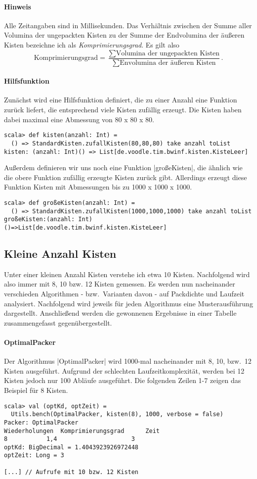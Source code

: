 \paragraph{Hinweis}
 Alle Zeitangaben sind in Millisekunden.
 Das Verhältnis zwischen der Summe aller Volumina der ungepackten Kisten zu der Summe der Endvolumina der äußeren Kisten bezeichne ich als \emph{Komprimierungsgrad}.
 Es gilt also
 \[ \text{Komprimierungsgrad} = \dfrac{\sum\text{Volumina der ungepackten Kisten}}{\sum\text{Envolumina der äußeren Kisten}} .\]
\paragraph{Hilfsfunktion}
 Zunächst wird eine Hilfsfunktion definiert, die zu einer Anzahl eine Funktion zurück liefert, die entsprechend viele Kisten zufällig erzeugt.
 Die Kisten haben dabei maximal eine Abmessung von 80 x 80 x 80.
\begin{lstlisting}
scala> def kisten(anzahl: Int) =
  () => StandardKisten.zufallKisten(80,80,80) take anzahl toList
kisten: (anzahl: Int)() => List[de.voodle.tim.bwinf.kisten.KisteLeer]
\end{lstlisting}
 Außerdem definieren wir uns noch eine Funktion |großeKisten|, die ähnlich wie die obere Funktion zufällig erzeugte Kisten zurück gibt.
 Allerdings erzeugt diese Funktion Kisten mit Abmessungen bis zu 1000 x 1000 x 1000.
\begin{lstlisting}
scala> def großeKisten(anzahl: Int) =
  () => StandardKisten.zufallKisten(1000,1000,1000) take anzahl toList
großeKisten:(anzahl: Int)()=>List[de.voodle.tim.bwinf.kisten.KisteLeer]
\end{lstlisting}

\subsection{Kleine Anzahl Kisten}
\label{optAlg}
 Unter einer kleinen Anzahl Kisten verstehe ich etwa 10 Kisten. Nachfolgend wird also immer mit 8, 10 bzw. 12 Kisten gemessen.
 Es werden nun nacheinander verschieden Algorithmen - bzw.\ Varianten davon - auf Packdichte und Laufzeit analysiert.
 Nachfolgend wird jeweils für jeden Algorithmus eine Musterausführung dargestellt.
 Anschließend werden die gewonnenen Ergebnisse in einer Tabelle zusammengefasst gegenübergestellt.
\paragraph{OptimalPacker}
 Der Algorithmus |OptimalPacker| wird 1000-mal nacheinander mit 8, 10, bzw.\ 12 Kisten ausgeführt.
 Aufgrund der schlechten Laufzeitkomplexität, werden bei 12 Kisten jedoch nur 100 Abläufe ausgeführt.
 Die folgenden Zeilen 1-7 zeigen das Beispiel für 8 Kisten.
\begin{lstlisting}
scala> val (optKd, optZeit) =
  Utils.bench(OptimalPacker, kisten(8), 1000, verbose = false)
Packer: OptimalPacker
Wiederholungen  Komprimierungsgrad      Zeit
8       	1,4                     3
optKd: BigDecimal = 1.4043923926972448
optZeit: Long = 3

[...] // Aufrufe mit 10 bzw. 12 Kisten
\end{lstlisting}

